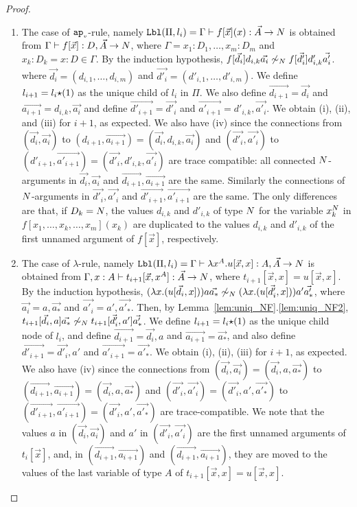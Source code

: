 \begin{proof}
\begin{enumerate}
  \item
    The case of ${{\tt ap}_{\mbox{\tiny $v$}}}$-rule, namely 
    ${\tt Lbl}(\Pi,l_i) 
    = 
    \Gamma \vdash f[\vec{x}](x): \vec{A}\rightarrow{N}$ is obtained from
    $\Gamma \vdash f[\vec{x}]: D,\vec{A} \rightarrow {N}$,
    where $\Gamma=x_1:D_1,\ldots,x_m:D_m$ and $x_k:D_k = x:D\in\Gamma$. 
    By the induction hypothesis, $f[\vec{d_i}]d_{i,k}\vec{a_i} \not\sim_{N} f[\vec{d'_i}]d'_{i,k}\vec{a'_i}$. 
    where $\vec{d_i} = (d_{i,1},\ldots,d_{i,m})$ and $\vec{d'_i} = (d'_{i,1},\ldots,d'_{i,m})$. 
    We define $l_{i+1}=l_i{\star}(1)$ as the unique child of $l_i$ in $\Pi$. 
    We also define $\vec{d_{i+1}} = \vec{d_i}$ and $\vec{a_{i+1}} = d_{i,k},\vec{a_i}$
    and define $\vec{d'_{i+1}} = \vec{d'_i}$ and $\vec{a'_{i+1}} = d'_{i,k},\vec{a'_i}$. 
    We obtain (i), (ii), and (iii) for $i+1$, as expected.
    We also have (iv) since the connections from
    $(\vec{d_i},\vec{a_i})$ to $(d_{i+1},\vec{a_{i+1}}) = (\vec{d_i},d_{i,k},\vec{a_i})$
    and
    $(\vec{d'_i},\vec{a'_i})$ to $(d'_{i+1},\vec{a'_{i+1}}) = (\vec{d'_i},d'_{i,k},\vec{a'_i})$
    are trace compatible: all connected ${N}$-arguments in $\vec{d_{i}},\vec{a_{i}}$ and 
    $\vec{d_{i+1}},\vec{a_{i+1}}$ are the same. Similarly
    the connections of ${N}$-arguments in $\vec{d'_i},\vec{a'_i}$ and $\vec{d'_{i+1}},\vec{a'_{i+1}}$ are the same.
    The only differences are that, if $D_k = {N}$, the values $d_{i,k}$ and $d'_{i,k}$ of type ${N}$
    for the variable $x_k^{N}$ in $f[x_1,\ldots,x_k,\ldots,x_m](x_k)$ are duplicated to the values
    $d_{i,k}$ and $d'_{i,k}$ of the first unnamed argument of $ f[\vec{x}]$, respectively. 

  \item
    The case of $\lambda$-rule, namely
    ${\tt Lbl}(\Pi,l_i) = 
    \Gamma\vdash \lambda x^A.u[\vec{x},x] : A, \vec{A} \rightarrow {N}$ is obtained from
    $\Gamma,x:A\vdash t_{i+1}[\vec{x},x^A]:\vec{A}\rightarrow{N}$, 
    where $t_{i+1}[\vec{x},x]=u[\vec{x},x]$.
    By the induction hypothesis, $(\lambda x.(u[\vec{d_i},x]))a\vec{a_*} \not\sim_{N} (\lambda x.(u[\vec{d'_i},x]))a'\vec{a'_*}$, 
    where $\vec{a_i} = a,\vec{a_*}$ and $\vec{a'_i} = a',\vec{a'_*}$.    
    Then, by Lemma~\ref{lem:uniq_NF}.\ref{lem:uniq_NF2}, $t_{i+1}[\vec{d_i},a]\vec{a_*}\not\sim_{N} t_{i+1}[\vec{d'_i},a']\vec{a'_*}$.
    We define $l_{i+1}=l_i{\star}(1)$ as the unique child node of $l_i$,
    and define $\vec{d_{i+1}} = \vec{d_i},a$ and $\vec{a_{i+1}} = \vec{a_*}$,
    and also define $\vec{d'_{i+1}} = \vec{d'_i},a'$ and $\vec{a'_{i+1}} = \vec{a'_*}$.
    We obtain (i), (ii), (iii) for $i+1$, as expected.
    We also have (iv) since the connections from 
    $(\vec{d_i},\vec{a_i}) = (\vec{d_i},a,\vec{a_*})$ to $(\vec{d_{i+1}},\vec{a_{i+1}}) = (\vec{d_i},a,\vec{a_*})$
    and
    $(\vec{d'_i},\vec{a'_i}) = (\vec{d'_i},a',\vec{a'_*})$ to $(\vec{d'_{i+1}},\vec{a'_{i+1}}) = (\vec{d'_i},a',\vec{a'_*})$
    are trace-compatible.
    We note that the values $a$ in $(\vec{d_i},\vec{a_i})$ and $a'$ in $(\vec{d'_i},\vec{a'_i})$ are
    the first unnamed arguments of $t_i[\vec{x}]$, and, in $(\vec{d_{i+1}},\vec{a_{i+1}})$ and $(\vec{d_{i+1}},\vec{a_{i+1}})$,
    they are moved to the values of the last variable of type $A$ of $t_{i+1}[\vec{x},x]=u[\vec{x},x]$.


\end{enumerate}
\end{proof}
